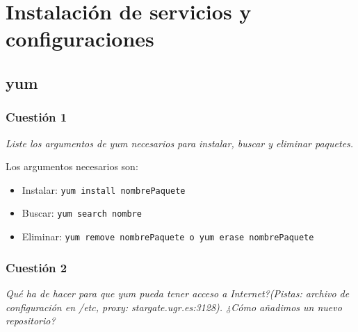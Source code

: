 



\maketitle %
\newpage %
\tableofcontents %
\listoffigures
\listoftables
\newpage


\section{Instalación de servicios y configuraciones}

\subsection{yum}



\subsubsection{Cuestión 1}
\textit{Liste los argumentos de yum necesarios para instalar, buscar y eliminar paquetes.}
\newline

Los argumentos necesarios son: \cite{manyum}
\begin{itemize}
  \item Instalar: \texttt{yum install nombrePaquete}
  \item Buscar: \texttt{yum search nombre}
  \item Eliminar: \texttt{yum remove nombrePaquete o yum erase nombrePaquete}
\end{itemize}






\subsubsection{Cuestión 2}
\textit{Qué ha de hacer para que yum pueda tener acceso a Internet?(Pistas: archivo de configuración en /etc, proxy: stargate.ugr.es:3128). ¿Cómo añadimos un nuevo repositorio?}
\newline




